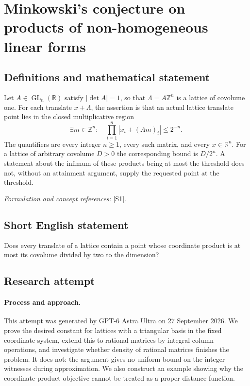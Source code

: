 \documentclass[11pt]{article}
\begin{document}
\section*{\texorpdfstring{Minkowski's conjecture on products of non-homogeneous linear forms}{Minkowski's conjecture on products of non-homogeneous linear forms}}\label{429}
\subsection{Definitions and mathematical statement}
Let $A\in\operatorname{GL}_n({\mathbb{R}})$ satisfy $|\det A|=1$, so that $\Lambda=A{\mathbb{Z}}^n$ is a lattice of covolume one. For each translate $x+\Lambda$, the assertion is that an actual lattice translate point lies in the closed multiplicative region
\[
 \exists m\in{\mathbb{Z}}^n:\quad \prod_{i=1}^n|x_i+(Am)_i|\le2^{-n}.
\]
The quantifiers are every integer $n\ge1$, every such matrix, and every $x\in{\mathbb{R}}^n$. For a lattice of arbitrary covolume $D>0$ the corresponding bound is $D/2^n$. A statement about the infimum of these products being at most the threshold does not, without an attainment argument, supply the requested point at the threshold.
\par\smallskip\textit{Formulation and concept references:} \href{https://arxiv.org/pdf/2009.09992v1}{[S1]}.

\subsection{Short English statement}
Does every translate of a lattice contain a point whose coordinate product is at most its covolume divided by two to the dimension?
\subsection{Research attempt}
\paragraph{Process and approach.}
This attempt was generated by GPT-6 Astra Ultra on 27 September 2026. We prove the desired constant for lattices with a triangular basis in the fixed coordinate system, extend this to rational matrices by integral column operations, and investigate whether density of rational matrices finishes the problem. It does not: the argument gives no uniform bound on the integer witnesses during approximation. We also construct an example showing why the coordinate-product objective cannot be treated as a proper distance function.
\end{document}
